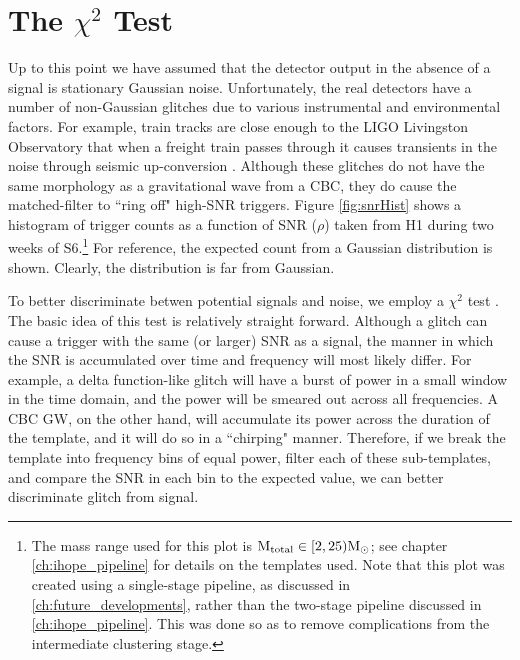\section{The $\chi^2$ Test}

Up to this point we have assumed that the detector output in the absence of a signal is stationary Gaussian noise. Unfortunately, the real detectors have a number of non-Gaussian glitches due to various instrumental and environmental factors. For example, train tracks are close enough to the \ac{LIGO} Livingston Observatory that when a freight train passes through it causes transients in the noise through seismic up-conversion \cite{ref:?}. Although these glitches do not have the same morphology as a gravitational wave from a \ac{CBC}, they do cause the matched-filter to ``ring off" high-\ac{SNR} triggers. Figure \ref{fig:snrHist} shows a histogram of trigger counts as a function of \ac{SNR} ($\rho$) taken from H1 during two weeks of \ac{S6}.\footnote{The mass range used for this plot is $\mathrm{M_{total}} \in [2,25)\mathrm{M_\odot}$; see chapter \ref{ch:ihope_pipeline} for details on the templates used. Note that this plot was created using a single-stage pipeline, as discussed in \ref{ch:future_developments}, rather than the two-stage pipeline discussed in \ref{ch:ihope_pipeline}. This was done so as to remove complications from the intermediate clustering stage.} For reference, the expected count from a Gaussian distribution is shown. Clearly, the distribution is far from Gaussian.

To better discriminate betwen potential signals and noise, we employ a $\chi^2$ test \cite{ref:Allen:2006}. The basic idea of this test is relatively straight forward. Although a glitch can cause a trigger with the same (or larger) \ac{SNR} as a signal, the manner in which the \ac{SNR} is accumulated over time and frequency will most likely differ. For example, a delta function-like glitch will have a burst of power in a small window in the time domain, and the power will be smeared out across all frequencies. A \ac{CBC} \ac{GW}, on the other hand, will accumulate its power across the duration of the template, and it will do so in a ``chirping" manner. Therefore, if we break the template into frequency bins of equal power, filter each of these sub-templates, and compare the \ac{SNR} in each bin to the expected value, we can better discriminate glitch from signal.

